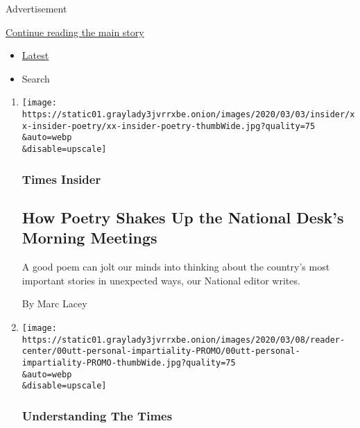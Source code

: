 Advertisement

\protect\hyperlink{after-mid1}{Continue reading the main story}

\begin{itemize}
\tightlist
\item
  \protect\hyperlink{stream-panel}{Latest}
\item
  Search
\end{itemize}

\begin{enumerate}
\def\labelenumi{\arabic{enumi}.}
\item
  \href{/2020/03/05/reader-center/poetry-national-news.html}{}

  \texttt{[image: https://static01.graylady3jvrrxbe.onion/images/2020/03/03/insider/xx-insider-poetry/xx-insider-poetry-thumbWide.jpg?quality=75\\\&auto=webp\\\&disable=upscale]}

  \hypertarget{times-insider-2}{%
  \subsubsection{Times Insider}\label{times-insider-2}}

  \hypertarget{how-poetry-shakes-up-the-national-desks-morning-meetings}{%
  \subsection{How Poetry Shakes Up the National Desk's Morning
  Meetings}\label{how-poetry-shakes-up-the-national-desks-morning-meetings}}

  A good poem can jolt our minds into thinking about the country's most
  important stories in unexpected ways, our National editor writes.

  By Marc Lacey
\item
  \href{/2020/03/02/reader-center/political-impartiality.html}{}

  \texttt{[image: https://static01.graylady3jvrrxbe.onion/images/2020/03/08/reader-center/00utt-personal-impartiality-PROMO/00utt-personal-impartiality-PROMO-thumbWide.jpg?quality=75\\\&auto=webp\\\&disable=upscale]}

  \hypertarget{understanding-the-times-3}{%
  \subsubsection{Understanding The
  Times}\label{understanding-the-times-3}}

  \hypertarget{no-politics-till-the-7th-date-how-journalists-try-to-stay-impartial}{%
}
\end{enumerate}
